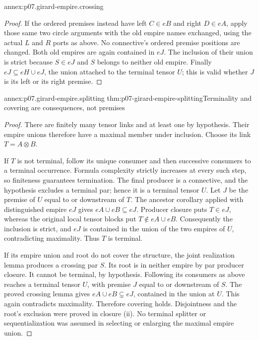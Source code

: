 \begin{annexitem}{annex:p07.girard-empire.crossing}
\begin{proof}
If the ordered premises instead have left \(C\in eB\) and right
\(D\in eA\), apply those same two circle arguments with the old
empire names exchanged, using the actual \(L\) and \(R\) ports as
above. No connective's ordered premise positions are changed.
Both old empires are again contained in \(eJ\).
The inclusion of their union is strict because \(S\in eJ\) and
\(S\) belongs to neither old empire.
Finally \(eJ\subseteq eH\cup eJ\), the union attached to the
terminal tensor \(U\); this is valid whether \(J\) is its left
or its right premise.
\end{proof}
\end{annexitem}

\begin{annexitem}{annex:p07.girard-empire.splitting}
 {thm:p07-girard-empire-splitting}{Terminality and covering are consequences, not premises}
\begin{proof}
There are finitely many tensor links and at least one by hypothesis.
Their empire unions therefore have a maximal member under inclusion.
Choose its link \(T=A\otimes B\).

If \(T\) is not terminal, follow its unique consumer and then successive
consumers to a terminal occurrence. Formula complexity strictly
increases at every such step, so finiteness guarantees termination.
The final producer is a connective, and the hypothesis excludes a
terminal par; hence it is a terminal tensor \(U\).
Let \(J\) be the premise of \(U\) equal to or downstream of \(T\).
The ancestor corollary applied with distinguished empire \(eJ\)
gives \(eA\cup eB\subseteq eJ\).
Producer closure puts \(T\in eJ\), whereas the original local tensor
blocks put \(T\notin eA\cup eB\).
Consequently the inclusion is strict, and \(eJ\) is contained in the
union of the two empires of \(U\), contradicting maximality.
Thus \(T\) is terminal.

If its empire union and root do not cover the structure, the joint
realization lemma produces a crossing par \(S\).
Its root is in neither empire by par producer closure.
It cannot be terminal, by hypothesis. Following its consumers as
above reaches a terminal tensor \(U\), with premise \(J\) equal to
or downstream of \(S\). The proved crossing lemma gives
\(eA\cup eB\subsetneq eJ\), contained in the union at \(U\).
This again contradicts maximality. Therefore covering holds.
Disjointness and the root's exclusion were proved in closure (ii).
No terminal splitter or sequentialization was assumed in selecting
or enlarging the maximal empire union.
\end{proof}
\end{annexitem}

